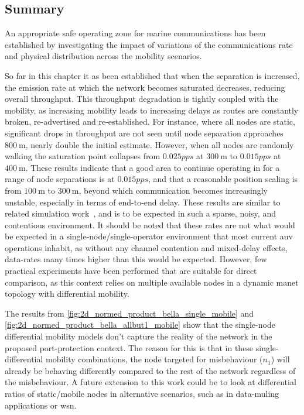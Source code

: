 \subsection{Summary}

An appropriate safe operating zone for marine communications has been established by investigating the impact of variations of the communications rate and physical distribution across the mobility scenarios.

So far in this chapter it as been established that when the separation is increased, the emission rate at which the network becomes saturated decreases, reducing overall throughput. 
This throughput degradation is tightly coupled with the mobility, as increasing mobility leads to increasing delays as routes are constantly broken, re-advertised and re-established. 
For instance, where all nodes are static, significant drops in throughput are not seen until node separation approaches $\SI{800}{\meter}$, nearly double the initial estimate. 
However, when all nodes are randomly walking the saturation point collapses from $0.025pps$ at $\SI{300}{\meter}$ to $0.015pps$ at $\SI{400}{\meter}$.
These results indicate that a good area to continue operating in for a range of node separations is at $0.015pps$, and that a reasonable position scaling is from $\SI{100}{\meter}$ to $\SI{300}{\meter}$, beyond which communication becomes increasingly unstable, especially in terms of end-to-end delay.
These results are similar to related simulation work~\cite{Miquel2008,Diamant2010,Noh2012}, and is to be expected in such a sparse, noisy, and contentious environment.
It should be noted that these rates are not what would be expected in a single-node/single-operator environment that most current \gls{auv} operations inhabit, as without any channel contention and mixed-delay effects, data-rates many times higher than this would be expected.
However, few practical experiments have been performed that are suitable for direct comparison, as this context relies on multiple available nodes in a dynamic \gls{manet} topology with differential mobility.


The results from \autoref{fig:2d_normed_product_bella_single_mobile} and \autoref{fig:2d_normed_product_bella_allbut1_mobile} show that the single-node differential mobility models don't capture the reality of the network in the proposed port-protection context.
The reason for this is that in these single-differential mobility combinations, the node targeted for misbehaviour ($n_1$) will already be behaving differently compared to the rest of the network regardless of the misbehaviour.
A future extension to this work could be to look at differential ratios of static/mobile nodes in alternative scenarios, such as in data-muling applications or \gls{wsn}.

